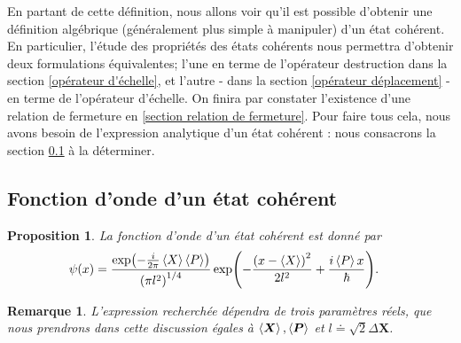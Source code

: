 \documentclass[11pt,oneside,a4paper]{article}
\newtheorem{property}[theorem]{Proposition}
\newtheorem{remark}[theorem]{Remarque}
\begin{document}
En partant de cette définition, nous allons voir qu'il est possible d'obtenir une définition algébrique (généralement plus simple à manipuler) d'un état cohérent. En particulier, l'étude des propriétés des états cohérents nous permettra d'obtenir deux formulations équivalentes; l'une en terme de l'opérateur destruction dans la section \ref{opérateur d'échelle}, et l'autre - dans la section \ref{opérateur déplacement} - en terme de l'opérateur d'échelle. On finira par constater l'existence d'une relation de fermeture en \ref{section relation de fermeture}. Pour faire tous cela, nous avons besoin de l'expression analytique d'un état cohérent : nous consacrons la section \ref{fonction d'onde d'un état cohérent} à la déterminer.

\subsection{Fonction d'onde d'un état cohérent}
\label{fonction d'onde d'un état cohérent}
\begin{property}
  La fonction d'onde d'un état cohérent est donné par
  \begin{align}
    \label{fonction d'onde}
    \psi(x) &= \frac{\exp(-\frac{i}{2\pi}\expval{X}\expval{P})}{\left(\pi l^2\right)^{1/4}}\exp(-\frac{\left(x-\expval{X}\right)^2}{2l^2}+\frac{i\expval{P}x}{\hbar}).
  \end{align}
\end{property}

\begin{remark}
  L'expression recherchée dépendra de trois paramètres réels, que nous prendrons dans cette discussion égales à $\expval{\bm{X}},\expval{\bm{P}}$ et $l \doteq \sqrt{2}\Delta\bm{X}$.
\end{remark}
\end{document}
